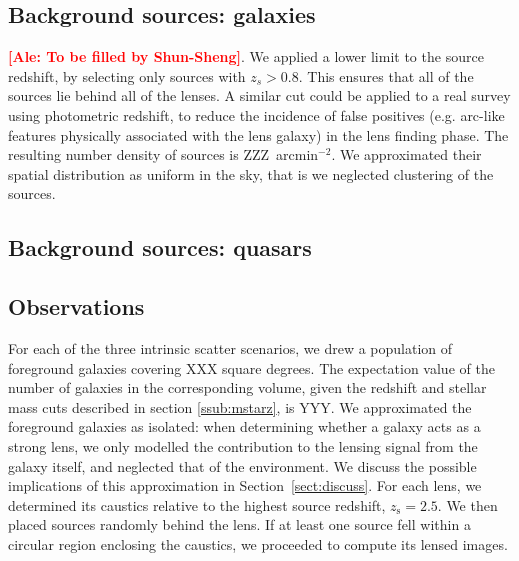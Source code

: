 \documentclass{aa}
\def\zsource{z_{\mathrm{s}}}
\def\Sref#1{Section~\ref{#1}\xspace}
\newcommand{\ale}[1]{\textcolor{red}{\textbf{[Ale: #1]}}}
\begin{document}
\subsection{Background sources: galaxies}\label{ssec:sources}

\ale{To be filled by Shun-Sheng}.
We applied a lower limit to the source redshift, by selecting only sources with $z_s > 0.8$.
This ensures that all of the sources lie behind all of the lenses.
A similar cut could be applied to a real survey using photometric redshift, to reduce the incidence of false positives (e.g. arc-like features physically associated with the lens galaxy) in the lens finding phase.
The resulting number density of sources is ZZZ~arcmin$^{-2}$.
We approximated their spatial distribution as uniform in the sky, that is we neglected clustering of the sources.

\subsection{Background sources: quasars}\label{ssec:quasars}

\subsection{Observations}\label{ssub:obs}

For each of the three intrinsic scatter scenarios, we drew a population of foreground galaxies covering XXX square degrees.
The expectation value of the number of galaxies in the corresponding volume, given the redshift and stellar mass cuts described in section \ref{ssub:mstarz}, is YYY.
We approximated the foreground galaxies as isolated: when determining whether a galaxy acts as a strong lens, we only modelled the contribution to the lensing signal from the galaxy itself, and neglected that of the environment.
We discuss the possible implications of this approximation in \Sref{sect:discuss}.
For each lens, we determined its caustics relative to the highest source redshift, $\zsource=2.5$. We then placed sources randomly behind the lens. If at least one source fell within a circular region enclosing the caustics, we proceeded to compute its lensed images.
\end{document}
